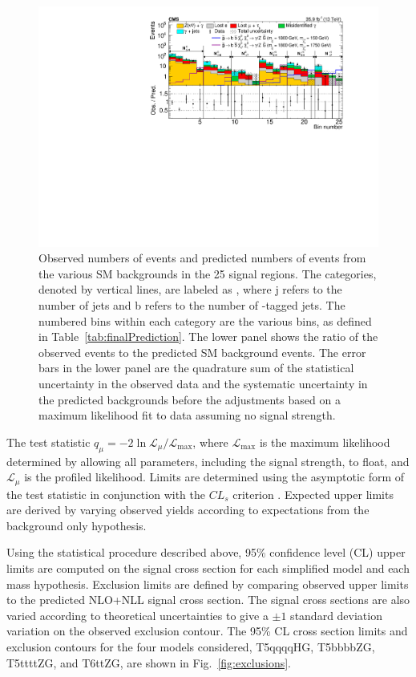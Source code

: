 \begin{figure}[htb!]
\centering
\includegraphics[width=0.99\linewidth]{../Figures/Chap4/Figure_004.pdf}
\captionsetup{width=.95\linewidth}
\caption{Observed numbers of events and predicted numbers of events from the various SM backgrounds in the 25 signal regions.
The categories, denoted by vertical lines, are labeled as \njb,
where j refers to the number of jets and b refers to the number of {\cPqb}-tagged jets.
The numbered bins within each category are the various \ptmiss bins, as defined in Table~\ref{tab:finalPrediction}. The lower panel
shows the ratio of the observed events to the predicted SM background events.
The error bars in the lower panel are the quadrature sum of the statistical uncertainty in the observed data
and the systematic uncertainty in the predicted backgrounds before the adjustments based on
a maximum likelihood fit to data assuming no signal strength.}
\label{fig:summaryPlot}
\end{figure}

The test statistic $q_{\mu} = -2 \ln{\mathcal{L}_{\mu}/ \mathcal{L}_{\mathrm{max}}}$, 
where $\mathcal{L}_{\mathrm{max}}$ 
is the maximum likelihood determined by allowing all parameters, including the signal 
strength, to float, and $\mathcal{L}_{\mu}$
is the profiled likelihood. Limits are determined using the asymptotic form of the test 
statistic \cite{Cowan:2010js} 
in conjunction with the $CL_s$ criterion \cite{Junk1999,bib-cls}. Expected 
upper limits are derived by varying observed yields according to expectations from the 
background only hypothesis.
\begin{sloppypar} Using the statistical procedure described above, 95\% confidence level (CL) upper limits
are computed on the signal cross section for each simplified model and each mass hypothesis.
Exclusion limits are defined by comparing observed upper limits to the predicted
NLO+NLL signal cross section. The signal cross
sections are also varied according to theoretical uncertainties to give a ${\pm}1$ standard deviation variation
on the observed exclusion contour.  The 95\% CL cross section limits and exclusion contours for the four models considered, T5qqqqHG, T5bbbbZG,
T5ttttZG, and T6ttZG, are shown in Fig.~\ref{fig:exclusions}.
\end{sloppypar}

